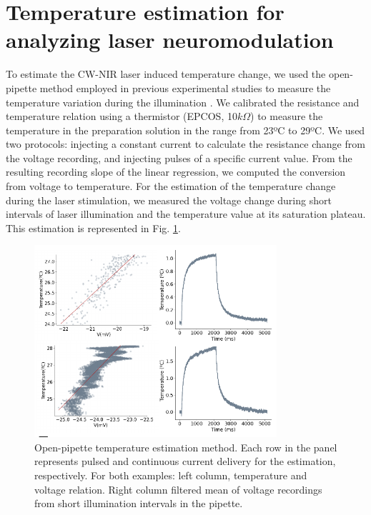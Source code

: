 \section{Temperature estimation for analyzing laser neuromodulation}
\label{sec:temperature-estimation}
To estimate the CW-NIR laser induced temperature change, we used the open-pipette method employed in previous experimental studies to measure the temperature variation during the illumination \parencite{li_temporal_2013, rabbitt_heat_2016,brown_thermal_2020, brown_response_2021}. We calibrated the resistance and temperature relation using a thermistor (EPCOS, 10$k\Omega$) to measure the temperature in the preparation solution in the range from 23ºC to 29ºC. We used two protocols:  injecting a constant current to calculate the resistance change from the voltage recording, and injecting pulses of a specific current value. From the resulting recording slope of the linear regression, we computed the conversion from voltage to temperature. For the estimation of the temperature change during the laser stimulation, we measured the voltage change during short intervals of laser illumination and the temperature value at its saturation plateau. This estimation is represented in Fig. \ref{fig:temperature estimation}.



\begin{figure}[htb!]
	\centering
	\includegraphics[width=0.8\textwidth]{img/laser/temperature_estimation.pdf}
	\caption{Open-pipette temperature estimation method. Each row in the panel represents pulsed and continuous current delivery for the estimation, respectively. For both examples: left column, temperature and voltage relation. Right column filtered mean of voltage recordings from short illumination intervals in the pipette. }
	\label{fig:temperature estimation}
\end{figure}

